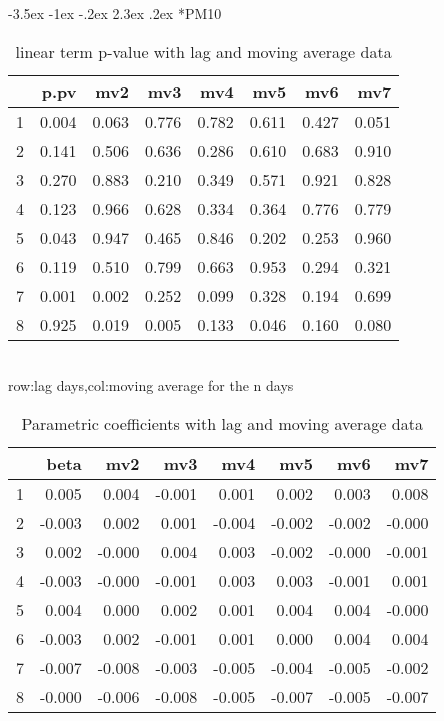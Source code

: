 \documentclass[a4paper, 12pt]{article}
\makeatletter
\def\large{\fontsize{14}{20}\selectfont}
\renewcommand\subsection{\@startsection {subsection}{1}{\z@}%
                                   {-3.5ex \@plus -1ex \@minus -.2ex}%
                                   {2.3ex \@plus.2ex}%
                                   {\centering\normalfont\large\bfseries}}
\makeatother
\begin{document}
\subsection*{PM10}
\begin{table}[h]
\centering
\caption{linear term p-value with lag and moving average data}
\begin{tabular}{rrrrrrrr}
  \hline
 & p.pv & mv2 & mv3 & mv4 & mv5 & mv6 & mv7 \\
  \hline
1 & 0.004 & 0.063 & 0.776 & 0.782 & 0.611 & 0.427 & 0.051 \\
  2 & 0.141 & 0.506 & 0.636 & 0.286 & 0.610 & 0.683 & 0.910 \\
  3 & 0.270 & 0.883 & 0.210 & 0.349 & 0.571 & 0.921 & 0.828 \\
  4 & 0.123 & 0.966 & 0.628 & 0.334 & 0.364 & 0.776 & 0.779 \\
  5 & 0.043 & 0.947 & 0.465 & 0.846 & 0.202 & 0.253 & 0.960 \\
  6 & 0.119 & 0.510 & 0.799 & 0.663 & 0.953 & 0.294 & 0.321 \\
  7 & 0.001 & 0.002 & 0.252 & 0.099 & 0.328 & 0.194 & 0.699 \\
  8 & 0.925 & 0.019 & 0.005 & 0.133 & 0.046 & 0.160 & 0.080 \\
   \hline
\end{tabular}
\\row:lag days,col:moving average for the n days
\end{table}

\begin{table}[h]
\centering
\caption{Parametric coefficients with lag and moving average data}
\begin{tabular}{rrrrrrrr}
  \hline
 & beta & mv2 & mv3 & mv4 & mv5 & mv6 & mv7 \\
  \hline
1 & 0.005 & 0.004 & -0.001 & 0.001 & 0.002 & 0.003 & 0.008 \\
  2 & -0.003 & 0.002 & 0.001 & -0.004 & -0.002 & -0.002 & -0.000 \\
  3 & 0.002 & -0.000 & 0.004 & 0.003 & -0.002 & -0.000 & -0.001 \\
  4 & -0.003 & -0.000 & -0.001 & 0.003 & 0.003 & -0.001 & 0.001 \\
  5 & 0.004 & 0.000 & 0.002 & 0.001 & 0.004 & 0.004 & -0.000 \\
  6 & -0.003 & 0.002 & -0.001 & 0.001 & 0.000 & 0.004 & 0.004 \\
  7 & -0.007 & -0.008 & -0.003 & -0.005 & -0.004 & -0.005 & -0.002 \\
  8 & -0.000 & -0.006 & -0.008 & -0.005 & -0.007 & -0.005 & -0.007 \\
   \hline
\end{tabular}
\end{table}
\clearpage
\end{document}
